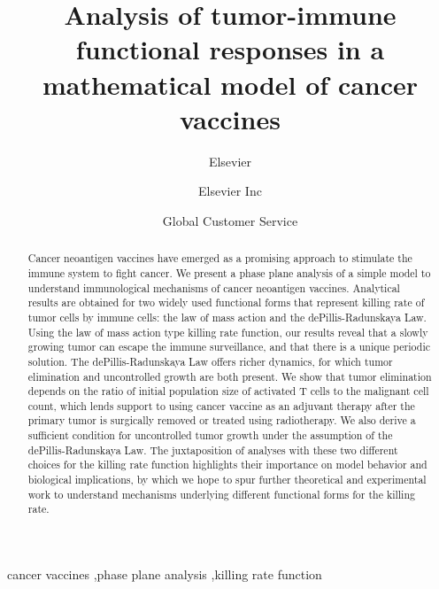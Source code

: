 \documentclass[review,authoryear]{elsarticle}
\begin{document}
\begin{frontmatter}

\title{Analysis of tumor-immune functional responses in a mathematical model
of cancer vaccines}


\author{Elsevier}
\address{Radarweg 29, Amsterdam}

\author[mymainaddress,mysecondaryaddress]{Elsevier Inc}

\author[mysecondaryaddress]{Global Customer Service}

\address[mymainaddress]{1600 John F Kennedy Boulevard, Philadelphia}
\address[mysecondaryaddress]{360 Park Avenue South, New York}

\begin{abstract}
Cancer neoantigen vaccines have emerged as a promising approach to stimulate
the immune system to fight cancer. We present a phase plane analysis
of a simple model to understand immunological mechanisms of
cancer neoantigen vaccines. Analytical results are obtained for
two widely used functional forms that represent killing rate of tumor cells by immune cells:
the law of mass action and the dePillis-Radunskaya Law. Using the law
of mass action type killing rate function, our results reveal that a slowly growing tumor can escape the immune surveillance, and that there is a unique periodic solution. The dePillis-Radunskaya Law offers richer dynamics, for which tumor elimination and uncontrolled growth are both present. We show that tumor elimination depends
on the ratio of initial population size of activated T cells to the malignant cell count, which lends support to using cancer vaccine
as an adjuvant therapy after the primary tumor is surgically removed or treated using radiotherapy. We also derive a sufficient condition for uncontrolled tumor growth under the assumption of the dePillis-Radunskaya Law. The juxtaposition of analyses with these two different choices for the killing rate function highlights their importance on model behavior and biological implications, by which we hope to spur further theoretical and experimental work to understand mechanisms underlying different functional forms for the killing rate. 
\end{abstract}

\begin{keyword}
cancer vaccines \sep phase plane analysis \sep killing rate function
\end{keyword}

\end{frontmatter}
\end{document}
